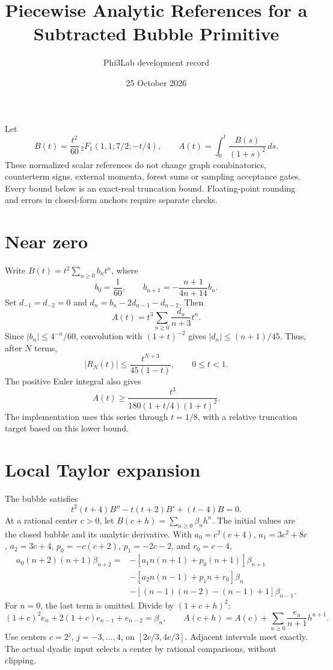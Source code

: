 \documentclass[11pt]{article}
\title{Piecewise Analytic References for a Subtracted Bubble Primitive}
\author{Phi3Lab development record}
\date{25 October 2026}
\begin{document}
\maketitle
Let
\[
 B(t)=\frac{t^2}{60}\,{}_2F_1(1,1;7/2;-t/4),\qquad
 A(t)=\int_0^t\frac{B(s)}{(1+s)^2}\,ds .
\]
These normalized scalar references do not change graph combinatorics,
counterterm signs, external momenta, forest sums or sampling acceptance gates.
Every bound below is an exact-real truncation bound. Floating-point rounding
and errors in closed-form anchors require separate checks.

\section{Near zero}
Write \(B(t)=t^2\sum_{n\geq0}b_nt^n\), where
\[
 b_0=\frac1{60},\qquad b_{n+1}=-\frac{n+1}{4n+14}b_n.
\]
Set \(d_{-1}=d_{-2}=0\) and \(d_n=b_n-2d_{n-1}-d_{n-2}\). Then
\[
 A(t)=t^3\sum_{n\geq0}\frac{d_n}{n+3}t^n.
\]
Since \(|b_n|\leq4^{-n}/60\), convolution with \((1+t)^{-2}\)
gives \(|d_n|\leq(n+1)/45\). Thus, after \(N\) terms,
\[
 |R_N(t)|\leq\frac{t^{N+3}}{45(1-t)},\qquad 0\leq t<1.
\]
The positive Euler integral also gives
\[
 A(t)\geq \frac{t^3}{180(1+t/4)(1+t)^2}.
\]
The implementation uses this series through \(t=1/8\), with a relative
truncation target based on this lower bound.

\section{Local Taylor expansion}
The bubble satisfies
\[
 t^2(t+4)B''-t(t+2)B'+(t-4)B=0.
\]
At a rational center \(c>0\), let \(B(c+h)=\sum_{n\geq0}\beta_nh^n\).
The initial values are the closed bubble and its analytic derivative. With
\(a_0=c^2(c+4)\), \(a_1=3c^2+8c\), \(a_2=3c+4\),
\(p_0=-c(c+2)\), \(p_1=-2c-2\), and \(r_0=c-4\),
\begin{align*}
a_0(n+2)(n+1)\beta_{n+2}={}&
-[a_1n(n+1)+p_0(n+1)]\beta_{n+1}\\
&-[a_2n(n-1)+p_1n+r_0]\beta_n\\
&-[(n-1)(n-2)-(n-1)+1]\beta_{n-1}.
\end{align*}
For \(n=0\), the last term is omitted. Divide by \((1+c+h)^2\):
\[
 (1+c)^2e_n+2(1+c)e_{n-1}+e_{n-2}=\beta_n,\qquad
 A(c+h)=A(c)+\sum_{n\geq0}\frac{e_n}{n+1}h^{n+1}.
\]
Use centers \(c=2^j\), \(j=-3,\ldots,4\), on
\([2c/3,4c/3]\). Adjacent intervals meet exactly. The actual dyadic
input selects a center by rational comparisons, without clipping.
\end{document}
